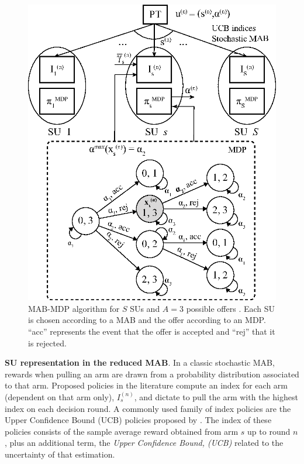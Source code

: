 \begin{figure}[!t]
\centering
\includegraphics[scale=0.9]{Esquema.eps}
\caption{MAB-MDP algorithm for $S$ SUs and $A=3$ possible offers . Each SU is chosen according to a MAB and the offer according to an MDP. ``acc'' represents the event that the offer is accepted and ``rej'' that it is rejected.}
\label{fig:Esquema}
\vspace{-1.5em}
\end{figure}

\textbf{SU representation in the reduced MAB}. In a classic stochastic MAB, rewards when pulling an arm are drawn from a probability distribution associated to that arm. Proposed policies in the literature compute an index for each arm (dependent on that arm only), $I_s^{(n)}$, and dictate to pull the arm with the highest index on each decision round. A commonly used family of index policies are the Upper Confidence Bound (UCB) policies proposed by \cite{ref:Auer2002}. 
The index of these policies consists of the sample average reward obtained from arm $s$ up to round $n$, plus an additional term, the \textit{Upper Confidence Bound, (UCB)} related to the uncertainty of that estimation. 

